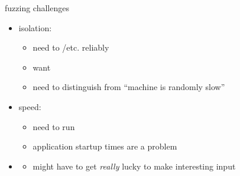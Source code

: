 
\begin{frame}{fuzzing challenges}
    \begin{itemize}
    \item isolation:
        \begin{itemize}
        \item need to /etc. reliably
        \item want 
        \item need to distinguish  from ``machine is randomly slow''
        \end{itemize}
    \item speed:
        \begin{itemize}
            \item need to run 
        \item application startup times are a problem
        \end{itemize}
    \item \textbf<2>{}
        \begin{itemize}
            \item might have to get \textit{really} lucky to make interesting input
        \end{itemize}
    \end{itemize}
\end{frame}
